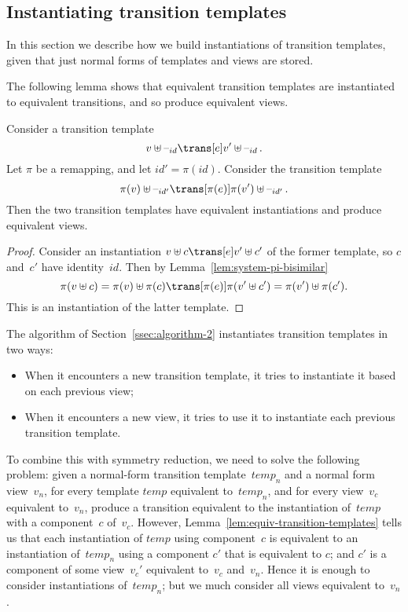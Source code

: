 \subsection{Instantiating transition templates}

In this section we describe how we build instantiations of transition
templates, given that just normal forms of templates and views are stored.

The following lemma shows that equivalent transition templates are
instantiated to equivalent transitions, and so produce equivalent views.
%
\begin{lemma}
\label{lem:equiv-transition-templates}
Consider a transition template 
\[
v \uplus \hole{id} \trans[e] v' \uplus \hole{id} \,.
\]
Let $\pi$ be a remapping, and let $id' = \pi(id)$.  Consider the transition
template
\[
\pi(v) \uplus \hole{id'} \trans[\pi(e)] \pi(v') \uplus \hole{id'} \,.
\]
Then the two transition templates have equivalent instantiations and produce
equivalent views.
\end{lemma}


\begin{proof}
Consider an instantiation $v \uplus c \trans[e] v' \uplus c'$ of the former
template, so $c$ and~$c'$ have identity~$id$.  Then by
Lemma~\ref{lem:system-pi-bisimilar}
\[
\pi(v \uplus c) = \pi(v) \uplus \pi(c) \trans[\pi(e)] 
  \pi(v' \uplus c') = \pi(v') \uplus \pi(c') .
\]
This is an instantiation of the latter template.
\end{proof}


The algorithm of Section~\ref{ssec:algorithm-2} instantiates transition
templates in two ways:
%
\begin{itemize}
\item When it encounters a new transition template, it tries to instantiate it
  based on each previous view;

\item When it encounters a new view, it tries to use it to instantiate each
  previous transition template.
\end{itemize}
%
To combine this with symmetry reduction, we need to solve the following
problem: given a normal-form transition template~$temp_n$ and a normal form
view~$v_n$, for every template $temp$ equivalent to~$temp_n$, and for every
view~$v_c$ equivalent to~$v_n$, produce a transition equivalent to the
instantiation of~$temp$ with a component~$c$ of~$v_c$.  However,
Lemma~\ref{lem:equiv-transition-templates} tells us that each instantiation of
$temp$ using component~$c$ is equivalent to an instantiation of~$temp_n$ using
a component $c'$ that is equivalent to $c$; and $c'$ is a component of some
view~$v_c'$ equivalent to~$v_c$ and~$v_n$.  Hence it is enough to consider
instantiations of~$temp_n$; but we much consider all views equivalent to~$v_n$.

